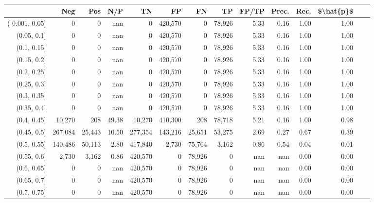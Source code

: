 \begin{tabular}{rrrrrrrrrrrrrr}
\toprule
{} &      Neg &     Pos &    N/P &       TN &       FP &      FN &      TP & FP/TP & Prec. &  Rec. & \$\textbackslash hat\{p\}\$ \\
\midrule
(-0.001, 0.05] &        0 &       0 &    nan &        0 &  420,570 &       0 &  78,926 &  5.33 &  0.16 &  1.00 &      1.00 \\
(0.05, 0.1]    &        0 &       0 &    nan &        0 &  420,570 &       0 &  78,926 &  5.33 &  0.16 &  1.00 &      1.00 \\
(0.1, 0.15]    &        0 &       0 &    nan &        0 &  420,570 &       0 &  78,926 &  5.33 &  0.16 &  1.00 &      1.00 \\
(0.15, 0.2]    &        0 &       0 &    nan &        0 &  420,570 &       0 &  78,926 &  5.33 &  0.16 &  1.00 &      1.00 \\
(0.2, 0.25]    &        0 &       0 &    nan &        0 &  420,570 &       0 &  78,926 &  5.33 &  0.16 &  1.00 &      1.00 \\
(0.25, 0.3]    &        0 &       0 &    nan &        0 &  420,570 &       0 &  78,926 &  5.33 &  0.16 &  1.00 &      1.00 \\
(0.3, 0.35]    &        0 &       0 &    nan &        0 &  420,570 &       0 &  78,926 &  5.33 &  0.16 &  1.00 &      1.00 \\
(0.35, 0.4]    &        0 &       0 &    nan &        0 &  420,570 &       0 &  78,926 &  5.33 &  0.16 &  1.00 &      1.00 \\
(0.4, 0.45]    &   10,270 &     208 &  49.38 &   10,270 &  410,300 &     208 &  78,718 &  5.21 &  0.16 &  1.00 &      0.98 \\
(0.45, 0.5]    &  267,084 &  25,443 &  10.50 &  277,354 &  143,216 &  25,651 &  53,275 &  2.69 &  0.27 &  0.67 &      0.39 \\
(0.5, 0.55]    &  140,486 &  50,113 &   2.80 &  417,840 &    2,730 &  75,764 &   3,162 &  0.86 &  0.54 &  0.04 &      0.01 \\
(0.55, 0.6]    &    2,730 &   3,162 &   0.86 &  420,570 &        0 &  78,926 &       0 &   nan &   nan &  0.00 &      0.00 \\
(0.6, 0.65]    &        0 &       0 &    nan &  420,570 &        0 &  78,926 &       0 &   nan &   nan &  0.00 &      0.00 \\
(0.65, 0.7]    &        0 &       0 &    nan &  420,570 &        0 &  78,926 &       0 &   nan &   nan &  0.00 &      0.00 \\
(0.7, 0.75]    &        0 &       0 &    nan &  420,570 &        0 &  78,926 &       0 &   nan &   nan &  0.00 &      0.00 \\

\end{tabular}
